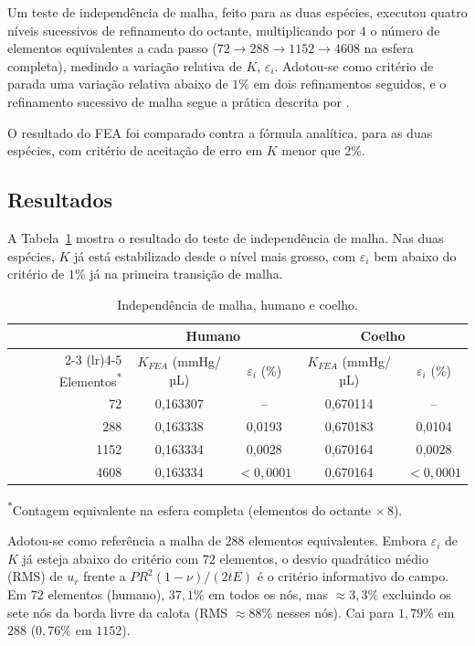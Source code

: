 Um teste de independência de malha, feito para as duas espécies, executou quatro níveis sucessivos de refinamento do octante, multiplicando por $4$ o número de elementos equivalentes a cada passo ($72\to288\to1152\to4608$ na esfera completa), medindo a variação relativa de $K$, $\varepsilon_i$. Adotou-se como critério de parada uma variação relativa abaixo de $1\%$ em dois refinamentos seguidos, e o refinamento sucessivo de malha segue a prática descrita por \citet{roache1997}.
 
O resultado do FEA foi comparado contra a fórmula analítica, para as duas espécies, com critério de aceitação de erro em $K$ menor que $2\%$.
 
\subsection{Resultados}

A Tabela~\ref{tab:wp1_independencia} mostra o resultado do teste de independência de malha. Nas duas espécies, $K$ já está estabilizado desde o nível mais grosso, com $\varepsilon_i$ bem abaixo do critério de $1\%$ já na primeira transição de malha.

\begin{table}[h]
\centering
\caption{Independência de malha, humano e coelho.}
\label{tab:wp1_independencia}
\begin{tabular}{@{}r cc cc@{}}
\toprule
 & \multicolumn{2}{c}{Humano} & \multicolumn{2}{c}{Coelho} \\
\cmidrule(lr){2-3} \cmidrule(lr){4-5}
Elementos\textsuperscript{*} & $K_{FEA}$ (mmHg/µL) & $\varepsilon_i$ (\%) & $K_{FEA}$ (mmHg/µL) & $\varepsilon_i$ (\%) \\
\midrule
72   & 0,163307 & --     & 0,670114 & --     \\
288  & 0,163338 & 0,0193 & 0,670183 & 0,0104 \\
1152 & 0,163334 & 0,0028 & 0,670164 & 0,0028 \\
4608 & 0,163334 & $<0{,}0001$ & 0,670164 & $<0{,}0001$ \\
\bottomrule
\end{tabular}
 
\vspace{2pt}
\footnotesize\textsuperscript{*}Contagem equivalente na esfera completa (elementos do octante $\times\,8$).
\end{table}

Adotou-se como referência a malha de $288$ elementos equivalentes. Embora $\varepsilon_i$ de $K$ já esteja abaixo do critério com $72$ elementos, o desvio quadrático médio (RMS) de $u_r$ frente a $PR^2(1-\nu)/(2tE)$ é o critério informativo do campo. Em $72$ elementos (humano), $37{,}1\%$ em todos os nós, mas $\approx3{,}3\%$ excluindo os sete nós da borda livre da calota (RMS $\approx88\%$ nesses nós). Cai para $1{,}79\%$ em $288$ ($0{,}76\%$ em $1152$).
 
